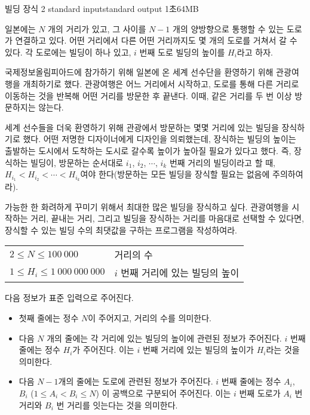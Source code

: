 \begin{problem}{빌딩 장식 2}
	{standard input}{standard output}
	{1초}{64MB}{}
	
	
	일본에는 $N$ 개의 거리가 있고, 그 사이를 $N-1$ 개의 양방향으로 통행할 수 있는 도로가 연결하고 있다. 어떤 거리에서 다른 어떤 거리까지도 몇 개의 도로를 거쳐서 갈 수 있다. 각 도로에는 빌딩이 하나 있고, $i$ 번째 도로 빌딩의 높이를 $H_i$라고 하자.
	
	국제정보올림피아드에 참가하기 위해 일본에 온 세계 선수단을 환영하기 위해 관광여행을 개최하기로 했다. 관광여행은 어느 거리에서 시작하고, 도로를 통해 다른 거리로 이동하는 것을 반복해 어떤 거리를 방문한 후 끝낸다. 이때, 같은 거리를 두 번 이상 방문하지는 않는다.
	
	세계 선수들을 더욱 환영하기 위해 관광에서 방문하는 몇몇 거리에 있는 빌딩을 장식하기로 했다. 어떤 저명한 디자이너에게 디자인을 의뢰했는데, 장식하는 빌딩의 높이는 출발하는 도시에서 도착하는 도시로 갈수록 높이가 높아질 필요가 있다고 했다. 즉, 장식하는 빌딩이, 방문하는 순서대로 $i_1$, $i_2$, $\cdots$, $i_k$ 번째 거리의 빌딩이라고 할 때, $H_{i_1} < H_{i_2} < \cdots < H_{i_k}$여야 한다(방문하는 모든 빌딩을 장식할 필요는 없음에 주의하여라).
	
	가능한 한 화려하게 꾸미기 위해서 최대한 많은 빌딩을 장식하고 싶다. 관광여행을 시작하는 거리, 끝내는 거리, 그리고 빌딩을 장식하는 거리를 마음대로 선택할 수 있다면, 장식할 수 있는 빌딩 수의 최댓값을 구하는 프로그램을 작성하여라.

	
	\Constraints
	

\begin{tabular}{ll}
	$2 \le N \le 100\ 000$ & 거리의 수 \\
	$1 \le H_i \le 1\ 000\ 000\ 000$ & 	$i$ 번째 거리에 있는 빌딩의 높이\\
\end{tabular}


	\InputFile
	
	다음 정보가 표준 입력으로 주어진다.
	
	\begin{itemize}
		\item 첫째 줄에는 정수 $N$이 주어지고, 거리의 수를 의미한다.
		\item 다음 $N$ 개의 줄에는 각 거리에 있는 빌딩의 높이에 관련된 정보가 주어진다. $i$ 번째 줄에는 정수 $H_i$가 주어진다. 이는 $i$ 번째 거리에 있는 빌딩의 높이가 $H_i$라는 것을 의미한다.
		\item 다음 $N-1$개의 줄에는 도로에 관련된 정보가 주어진다. $i$ 번째 줄에는 정수 $A_i$, $B_i$ ($1 \le A_i < B_i \le N$) 이 공백으로 구분되어 주어진다. 이는 $i$ 번째 도로가 $A_i$ 번 거리와 $B_i$ 번 거리를 잇는다는 것을 의미한다.
	\end{itemize}


\end{problem}

